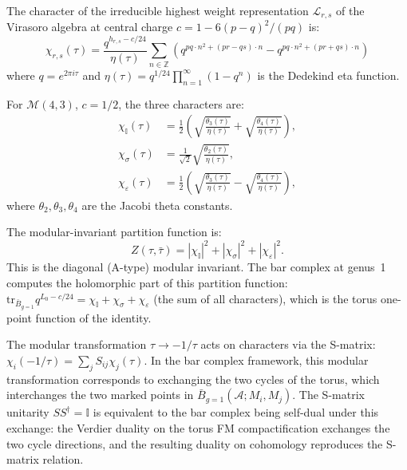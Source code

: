 \begin{theorem}
\label{thm:minimal-model-characters}
The character of the irreducible highest weight representation
$\mathcal{L}_{r,s}$ of the Virasoro algebra at central charge
$c = 1 - 6(p-q)^2/(pq)$ is:
\[
\chi_{r,s}(\tau) = \frac{q^{h_{r,s} - c/24}}{\eta(\tau)}
\sum_{n \in \mathbb{Z}} \left(
q^{pq \cdot n^2 + (pr-qs) \cdot n}
- q^{pq \cdot n^2 + (pr+qs) \cdot n}
\right)
\]
where $q = e^{2\pi i \tau}$ and $\eta(\tau) = q^{1/24}\prod_{n=1}^\infty(1-q^n)$
is the Dedekind eta function.
\end{theorem}

\begin{computation}
\label{comp:ising-characters}

For $\mathcal{M}(4,3)$, $c = 1/2$, the three characters are:
\begin{align*}
\chi_{\mathbb{I}}(\tau) &= \frac{1}{2}\left(
\sqrt{\frac{\theta_3(\tau)}{\eta(\tau)}}
+ \sqrt{\frac{\theta_4(\tau)}{\eta(\tau)}} \right), \\
\chi_\sigma(\tau) &= \frac{1}{\sqrt{2}}
\sqrt{\frac{\theta_2(\tau)}{\eta(\tau)}}, \\
\chi_\varepsilon(\tau) &= \frac{1}{2}\left(
\sqrt{\frac{\theta_3(\tau)}{\eta(\tau)}}
- \sqrt{\frac{\theta_4(\tau)}{\eta(\tau)}} \right),
\end{align*}
where $\theta_2, \theta_3, \theta_4$ are the Jacobi theta constants.

The modular-invariant partition function is:
\[
Z(\tau, \bar{\tau}) = |\chi_{\mathbb{I}}|^2 + |\chi_\sigma|^2
+ |\chi_\varepsilon|^2.
\]
This is the diagonal (A-type) modular invariant. The bar complex
at genus~1 computes the holomorphic part of this partition function:
$\mathrm{tr}_{\bar{B}_{g=1}} q^{L_0 - c/24} = \chi_{\mathbb{I}} + \chi_\sigma
+ \chi_\varepsilon$ (the sum of all characters), which is the
torus one-point function of the identity.
\end{computation}

\begin{remark}
\label{rem:modular-bar-periodicity}
The modular transformation $\tau \to -1/\tau$ acts on characters via
the S-matrix: $\chi_i(-1/\tau) = \sum_j S_{ij} \chi_j(\tau)$.
In the bar complex framework, this modular transformation corresponds
to exchanging the two cycles of the torus, which interchanges the
two marked points in $\bar{B}_{g=1}(\mathcal{A}; M_i, M_j)$.
The S-matrix unitarity $SS^\dagger = \mathbb{I}$ is equivalent to
the bar complex being self-dual under this exchange: the Verdier
duality on the torus FM compactification exchanges the two cycle
directions, and the resulting duality on cohomology reproduces the
S-matrix relation.
\end{remark}



